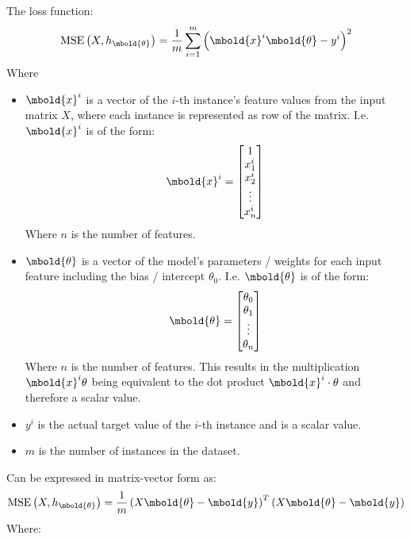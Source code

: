 \documentclass[12pt letter]{report}
\begin{document}
The loss function:
\[
  \text{MSE} \left( X, h_{\mbold{\theta}} \right) = \frac{1}{m} \displaystyle\sum_{i=1}^{m} \left( \mbold{x}^{i}
  \mbold{\theta} -
  y^{i} \right)^2
\]
Where
\begin{itemize}
  \item $\mbold{x}^{i}$ is a vector of the $i$-th instance's feature values from the input matrix $X$, where each
        instance is represented as row of the matrix. I.e. $\mbold{x}^{i}$ is of the form:
        \[
          \mbold{x}^{i} = \begin{bmatrix}
            1       \\
            x_1^{i} \\
            x_2^{i} \\
            \vdots  \\
            x_n^{i}
          \end{bmatrix}
        \]
        Where $n$ is the number of features.
  \item $\mbold{\theta}$ is a vector of the model's parameters / weights for each input feature including the bias / intercept
        $\theta_0$. I.e. $\mbold{\theta}$ is of the form:
        \[
          \mbold{\theta} = \begin{bmatrix}
            \theta_0 \\
            \theta_1 \\
            \vdots   \\
            \theta_n
          \end{bmatrix}
        \]
        Where $n$ is the number of features. This results in the multiplication $\mbold{x}^{i} \theta$ being equivalent to
        the dot product $\mbold{x}^{i} \cdot \theta$ and therefore a scalar value.
  \item $y^{i}$ is the actual target value of the $i$-th instance and is a scalar value.
  \item $m$ is the number of instances in the dataset.
\end{itemize}
Can be expressed in matrix-vector form as:
\[
  \text{MSE} \left( X, h_{\mbold{\theta}} \right) = \frac{1}{m} \left( X \mbold{\theta} - \mbold{y} \right)^{T} \left( X \mbold{\theta} - \mbold{y} \right)
\]
Where:
\end{document}
